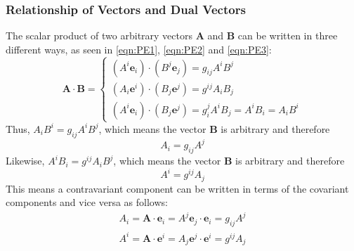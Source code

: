\subsubsection{Relationship of Vectors and Dual Vectors}
The scalar product of two arbitrary vectors $\bm A$ and $\bm B$ can be written in three different ways, as seen in \eqref{eqn:PE1}, \eqref{eqn:PE2} and \eqref{eqn:PE3}:
\begin{equation}
\bm A \cdot \bm B=
\begin{cases}
(A^i\bm e_i)\cdot(B^j\bm e_j)=g_{ij}A^iB^j\\
(A_i\bm e^i)\cdot(B_ j\bm e^j)=g^{ij}A_iB_j\\
(A^i\bm e_i)\cdot(B_j\bm e^j)=g_{i}^jA^iB_j=A^iB_i=A_iB^i
\end{cases}
\end{equation}
Thus, $A_iB^i=g_{ij}A^iB^j$, which means the vector $\bm B$ is arbitrary and therefore
\begin{equation}
A_i=g_{ij}A^j
\end{equation}
Likewise, $A^iB_i=g^{ij}A_iB^j$, which means the vector $\bm B$ is arbitrary and therefore
\begin{equation}
A^i=g^{ij}A_j
\end{equation}
This means a contravariant component can be written in terms of the covariant components and vice versa as follows:
\begin{align}
A_i=\bm A\cdot \bm e_i = A^j\bm e_j\cdot \bm e_i=g_{ij}A^j\\
A^i=\bm A\cdot \bm e^i = A_j\bm e^j\cdot \bm e^i=g^{ij}A_j
\end{align}